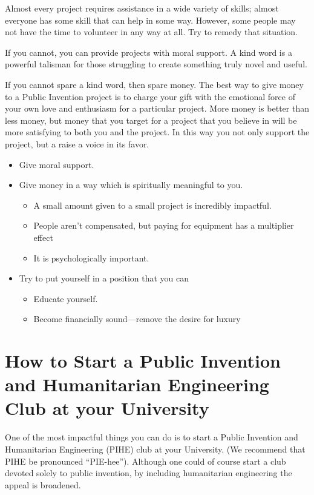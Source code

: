 \documentclass[
	fontsize=10pt, %
	twoside=false, %
	secnumdepth=1, %
]{kaobook}
\begin{document}
Almost every project requires assistance in a wide variety
of skills; almost everyone has some skill that can help in some way.
However, some people may not have the time to volunteer in any way
at all. Try to remedy that situation.

If you cannot, you can provide projects with moral support.
A kind word is a powerful talisman for those struggling
to create something truly novel and useful.

If you cannot spare a kind word, then spare money.
The best way to give money to a Public Invention project is
to charge your gift with the emotional force of your own
love and enthusiasm for a particular project.
More money is better than less money, but money that
you target for a project that you believe in will be
more satisfying to both you and the project.
In this way you not only support the project, but
a raise a voice in its favor.

\begin{itemize}
\item Give moral support.
\item
  Give money in a way which is spiritually meaningful to you.
  \begin{itemize}
  \item A small amount given to a small project is incredibly impactful.
  \item People aren’t compensated, but paying for equipment has a multiplier effect
  \item It is psychologically important.
  \end{itemize}
\item Try to put yourself in a position that you can
  \begin{itemize}
  \item Educate yourself.
  \item Become financially sound---remove the desire for luxury
  \end{itemize}
\end{itemize}

\section{How to Start a Public Invention and Humanitarian Engineering Club at your University}

\label{sec:piheclub}


One of the most impactful things you can do is to start a Public Invention and Humanitarian Engineering (PIHE) club at your University. (We recommend that PIHE be pronounced “PIE-hee”). Although one could of course start a club devoted
solely to public invention, by including humanitarian engineering the appeal is broadened.
\end{document}
